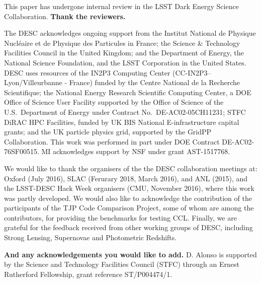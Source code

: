 %
This paper has undergone internal review in the LSST Dark Energy Science Collaboration. {\bf Thank the reviewers.}

The DESC acknowledges ongoing support from the Institut National de Physique Nucl\'eaire et de Physique des Particules in France; the Science \& Technology Facilities Council in the United Kingdom; and the Department of Energy, the National Science Foundation, and the LSST Corporation in the United States.  DESC uses resources of the IN2P3 Computing Center (CC-IN2P3--Lyon/Villeurbanne - France) funded by the Centre National de la Recherche Scientifique; the National Energy Research Scientific Computing Center, a DOE Office of Science User Facility supported by the Office of Science of the U.S.\ Department of Energy under Contract No.\ DE-AC02-05CH11231; STFC DiRAC HPC Facilities, funded by UK BIS National E-infrastructure capital grants; and the UK particle physics grid, supported by the GridPP Collaboration.  This work was performed in part under DOE Contract DE-AC02-76SF00515. MI acknowledges support by NSF under grant AST-1517768.

We would like to thank the organisers of the the DESC collaboration meetings at: Oxford (July 2016), SLAC (Ferurary 2018, March 2016), and ANL (2015), and the LSST-DESC Hack Week organisers (CMU, November 2016), where this work 
was partly developed. We would also like to acknowledge the contribution of the participants of the TJP Code Comparison Project, some of whom are among the \ccl contributors, for providing the benchmarks for  testing CCL. Finally, we are grateful for the feedback received from other working groups of DESC, including Strong Lensing, Supernovae and Photometric Redshifts.

%
{\bf And any acknowledgements you would like to add.}
D. Alonso is supported by the Science and Technology Facilities Council (STFC) through an Ernest Rutherford Fellowship, grant reference ST/P004474/1.
 

